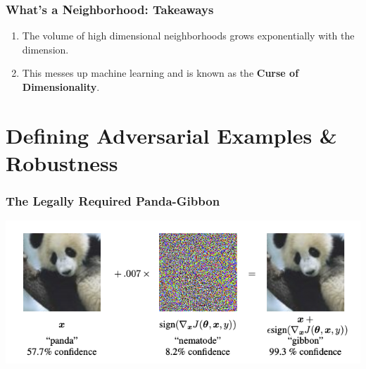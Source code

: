 \documentclass{beamer}
\begin{document}
\begin{frame}
    \frametitle{What's a Neighborhood: Takeaways}
    \begin{enumerate}
        \item The volume of high dimensional neighborhoods grows exponentially with the dimension.
        \item This messes up machine learning and is known as the \textbf{Curse of Dimensionality}.
    \end{enumerate}
\end{frame}

\section{Defining Adversarial Examples \& Robustness}

\begin{frame}
    \frametitle{The Legally Required Panda-Gibbon}
    \begin{center}
    \includegraphics[scale=0.45]{adversarial_example.png}
    \end{center}
    \cite{fgsm_paper}
\end{frame}
\end{document}
